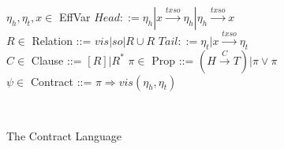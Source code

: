 \begin{figure}[h]
	\centering
	\begin{minipage}{.75\textwidth}
		$\eta_h,\eta_t, x \in$ EffVar  \hspace {35.5 mm} $Head    ::=    \eta_h | x \xrightarrow{txso} \eta_h | \eta_h \xrightarrow{txso} x$ \\
		$R \in $ Relation ::= $vis | so | R \cup R $ \hspace{20 mm}
		$Tail ::= \eta_t | x \xrightarrow{txso} \eta_t $ \\
		$C \in $ Clause ::= $[R] | R^*$ \hspace{30 mm}		
		$\pi \in$ Prop ::= $(H \xrightarrow{C} T) | \pi \vee \pi$ \\
		$\psi \in$ Contract ::= $ \pi \Rightarrow vis (\eta_h,\eta_t)$ \\
	\end{minipage}
	\\
	\hrulefill
	\caption{The Contract Language}
	\label{fig:ctrt}
\end{figure}
